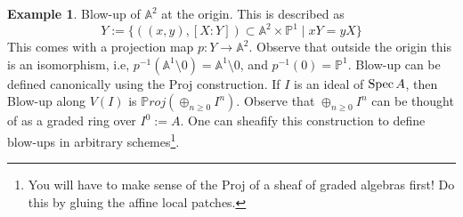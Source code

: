 \documentclass[11pt]{amsart}
\newcommand{\Proj}{{\P roj}}
\newcommand{\Spec}{{\rm Spec \,}}
\newcommand{\A}{{\mathbb A}}
\renewcommand{\P}{{\mathbb P}}
\theoremstyle{definition}
\newtheorem{example}[theorem]{Example}
\begin{document}
\begin{example}\label{example-blow-up}
	Blow-up of $\A^2$ at the origin. This is described as 
	\[Y:=\lbrace ((x,y),[X:Y])\subset \A^2\times\P^1\; |\; xY=yX\rbrace\]
	This comes with a projection map $p: Y\rightarrow \A^2$. Observe that outside the origin this is an isomorphism, i.e, $p^{-1}(\A^1\setminus 0)=\A^1\setminus 0$, and $p^{-1}(0)=\P^1$. Blow-up can be defined canonically using the Proj construction. If $I$ is an ideal of $\Spec A$, then Blow-up along $V(I)$ is $\Proj(\oplus_{n\geq 0}I^n)$. Observe that $\oplus_{n\geq 0}I^n$ can be thought of as a graded ring over $I^0:= A$. One can sheafify this construction to define blow-ups in arbitrary schemes\footnote{You will have to make sense of the Proj of a sheaf of graded algebras first! Do this by gluing the affine local patches.}.%
	
\end{example}
\end{document}
